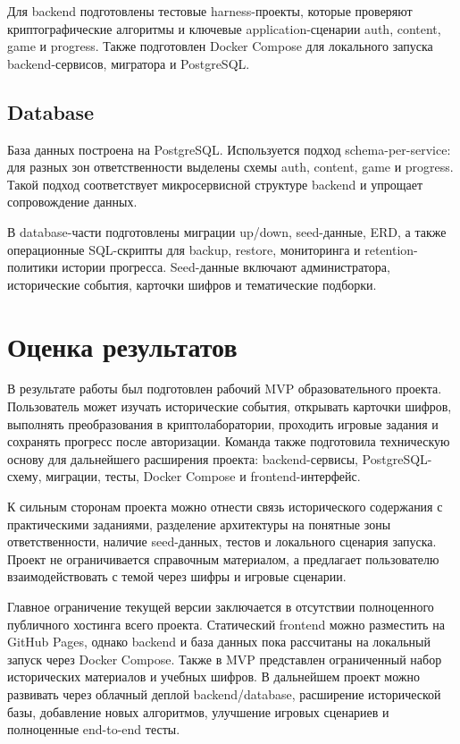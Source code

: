 \documentclass[14pt,a4paper]{extarticle}
\begin{document}
Для backend подготовлены тестовые harness-проекты, которые проверяют криптографические алгоритмы и ключевые application-сценарии auth, content, game и progress. Также подготовлен Docker Compose для локального запуска backend-сервисов, мигратора и PostgreSQL.

\subsection{Database}

База данных построена на PostgreSQL. Используется подход schema-per-service: для разных зон ответственности выделены схемы auth, content, game и progress. Такой подход соответствует микросервисной структуре backend и упрощает сопровождение данных.

В database-части подготовлены миграции up/down, seed-данные, ERD, а также операционные SQL-скрипты для backup, restore, мониторинга и retention-политики истории прогресса. Seed-данные включают администратора, исторические события, карточки шифров и тематические подборки.

\section{Оценка результатов}

В результате работы был подготовлен рабочий MVP образовательного проекта. Пользователь может изучать исторические события, открывать карточки шифров, выполнять преобразования в криптолаборатории, проходить игровые задания и сохранять прогресс после авторизации. Команда также подготовила техническую основу для дальнейшего расширения проекта: backend-сервисы, PostgreSQL-схему, миграции, тесты, Docker Compose и frontend-интерфейс.

К сильным сторонам проекта можно отнести связь исторического содержания с практическими заданиями, разделение архитектуры на понятные зоны ответственности, наличие seed-данных, тестов и локального сценария запуска. Проект не ограничивается справочным материалом, а предлагает пользователю взаимодействовать с темой через шифры и игровые сценарии.

Главное ограничение текущей версии заключается в отсутствии полноценного публичного хостинга всего проекта. Статический frontend можно разместить на GitHub Pages, однако backend и база данных пока рассчитаны на локальный запуск через Docker Compose. Также в MVP представлен ограниченный набор исторических материалов и учебных шифров. В дальнейшем проект можно развивать через облачный деплой backend/database, расширение исторической базы, добавление новых алгоритмов, улучшение игровых сценариев и полноценные end-to-end тесты.
\end{document}
